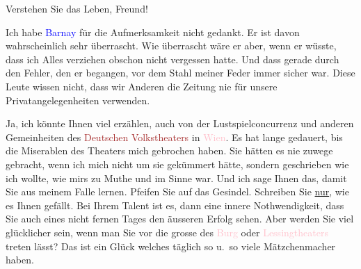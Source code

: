 \pstart
           Verstehen Sie das Leben, Freund!\pend
           
\pstart
           Ich habe \textcolor{blue}{Barnay}\ledrightnote{\textcolor{blue}{Ludwig Barnay}} für die Aufmerksamkeit nicht
               gedankt. Er ist davon wahrscheinlich sehr überrascht. Wie überrascht wäre er aber,
               wenn er wüsste, dass ich Alles verziehen  obschon
               nicht vergessen hatte. Und dass \label{T_L03830-1v}\label{T_L03830-1}
               gerade durch den Fehler, den er begangen, vor dem Stahl meiner Feder immer sicher
               war. Diese Leute wissen nicht, dass wir Anderen die Zeitung nie für unsere
               Privatangelegenheiten verwenden.\pend
           
\pstart
           Ja, ich könnte Ihnen viel erzählen, auch von der Lustspielconcurrenz und anderen
               Gemeinheiten des \textcolor{brown}{Deutschen Volkstheaters}\ledrightnote{\textcolor{brown}{Volkstheater}} in \textcolor{pink}{Wien}\ledrightnote{\textcolor{pink}{Wien}}.  Es hat lange gedauert, bis die Miserablen des {\pb}Theaters mich gebrochen haben. Sie hätten
               es nie zuwege gebracht, wenn ich mich nicht um sie gekümmert hätte, sondern
               geschrieben wie ich wollte, wie mirs zu Muthe und im Sinne war. Und ich sage Ihnen
               das, damit Sie aus meinem Falle lernen. Pfeifen Sie auf das Gesindel. Schreiben Sie
                  \uline{nur}, wie es Ihnen gefällt. Bei Ihrem Talent ist
               es, dann eine innere Nothwendigkeit, dass Sie auch eines nicht fernen Tages den
               äusseren Erfolg sehen. Aber werden Sie viel glücklicher sein, wenn man Sie  vor die grosse \label{K_L03830-16v}\label{K_L03830-16}{ }des \textcolor{pink}{Burg}\ledrightnote{\textcolor{pink}{Burgtheater}} oder
                  \textcolor{pink}{Lessingtheaters}\ledrightnote{\textcolor{pink}{Lessing-Theater}} treten lässt? Das ist ein Glück
               welches täglich so u. so viele Mätzchenmacher haben.\pend
           
